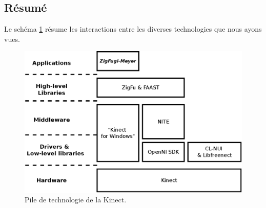 \subsection{Résumé}
Le schéma \ref{fig:technology_overview} résume les interactions entre les diverses 
technologies que nous ayons vues.

\begin{figure}[h!]
\centering
\includegraphics[width=0.9\linewidth]{../images/technology_overview}
\caption{Pile de technologie de la Kinect.}
\label{fig:technology_overview}
\end{figure}
